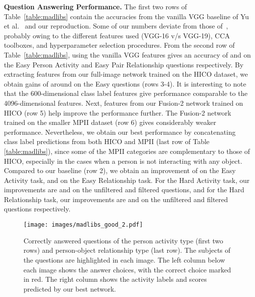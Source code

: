 \documentclass[runningheads]{llncs}
\begin{document}
{\bf Question Answering Performance.}
The first two rows of Table~\ref{table:madlibs} contain the accuracies from the vanilla VGG baseline of Yu et al.~\cite{yu2015visual} and our reproduction. Some of our numbers deviate from those of~\cite{yu2015visual}, probably owing to the different features used (VGG-16 v/s VGG-19), CCA toolboxes, and hyperparameter selection procedures. From the second row of Table~\ref{table:madlibs}, using the vanilla VGG features gives an accuracy of  and  on the Easy Person Activity and Easy Pair Relationship questions respectively. By extracting features from our full-image network trained on the HICO dataset, we obtain gains of around  on the Easy questions (rows 3-4). It is interesting to note that the 600-dimensional class label features give performance comparable to the 4096-dimensional  features. Next, features from our Fusion-2 network trained on HICO (row 5) help improve the performance further. The Fusion-2 network trained on the smaller MPII dataset (row 6) gives considerably weaker performance. Nevertheless, we obtain our best performance by concatenating class label predictions from both HICO and MPII (last row of Table \ref{table:madlibs}), since some of the MPII categories are complementary to those of HICO, especially in the cases when a person is not interacting with any object. Compared to our baseline (row 2), we obtain an improvement of  on the Easy Activity task, and  on the Easy Relationship task. For the Hard Activity task, our improvements are  and  on the unfiltered and filtered questions, and for the Hard Relationship task, our improvements are  and  on the unfiltered and filtered questions respectively.

\begin{figure}[h!]
    \centering
    \texttt{[image: images/madlibs\_good\_2.pdf]}
    \caption{Correctly answered questions of the person activity type (first two rows) and person-object relationship type (last row). The subjects of the questions are highlighted in each image. The left column below each image shows the answer choices, with the correct choice marked in red. The right column shows the activity labels and scores predicted by our best network.}
    \label{fig:madlibs_good}
\end{figure}
\end{document}
